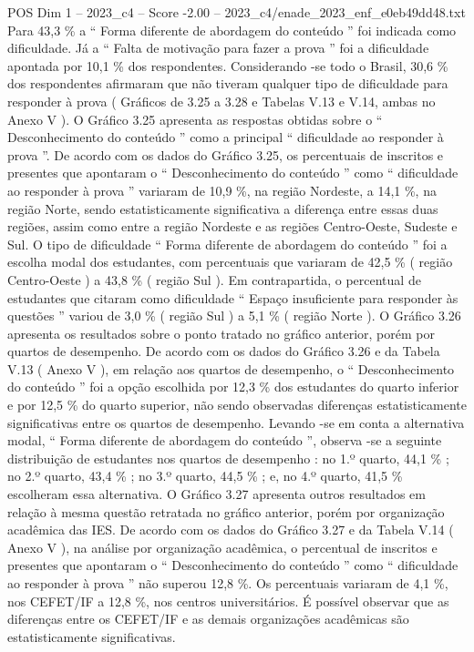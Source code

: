 \begin{textsample}{POS Dim 1 – 2023\_c4 – Score -2.00 – 2023\_c4/enade\_2023\_enf\_e0eb49dd48.txt}
Para 43,3 \% a “ Forma diferente de abordagem do conteúdo ” foi indicada como dificuldade.
Já a “ Falta de motivação para fazer a prova ” foi a dificuldade apontada por 10,1 \% dos respondentes.
Considerando -se todo o Brasil, 30,6 \% dos respondentes afirmaram que não tiveram qualquer tipo de dificuldade para responder à prova ( Gráficos de 3.25 a 3.28 e Tabelas V.13 e V.14, ambas no Anexo V ).
O Gráfico 3.25 apresenta as respostas obtidas sobre o “ Desconhecimento do conteúdo ” como a principal “ dificuldade ao responder à prova ”.
De acordo com os dados do Gráfico 3.25, os percentuais de inscritos e presentes que apontaram o “ Desconhecimento do conteúdo ” como “ dificuldade ao responder à prova ” variaram de 10,9 \%, na região Nordeste, a 14,1 \%, na região Norte, sendo estatisticamente significativa a diferença entre essas duas regiões, assim como entre a região Nordeste e as regiões Centro-Oeste, Sudeste e Sul.
O tipo de dificuldade “ Forma diferente de abordagem do conteúdo ” foi a escolha modal dos estudantes, com percentuais que variaram de 42,5 \% ( região Centro-Oeste ) a 43,8 \% ( região Sul ).
Em contrapartida, o percentual de estudantes que citaram como dificuldade “ Espaço insuficiente para responder às questões ” variou de 3,0 \% ( região Sul ) a 5,1 \% ( região Norte ).
O Gráfico 3.26 apresenta os resultados sobre o ponto tratado no gráfico anterior, porém por quartos de desempenho.
De acordo com os dados do Gráfico 3.26 e da Tabela V.13 ( Anexo V ), em relação aos quartos de desempenho, o “ Desconhecimento do conteúdo ” foi a opção escolhida por 12,3 \% dos estudantes do quarto inferior e por 12,5 \% do quarto superior, não sendo observadas diferenças estatisticamente significativas entre os quartos de desempenho.
Levando -se em conta a alternativa modal, “ Forma diferente de abordagem do conteúdo ”, observa -se a seguinte distribuição de estudantes nos quartos de desempenho : no 1.º quarto, 44,1 \% ; no 2.º quarto, 43,4 \% ; no 3.º quarto, 44,5 \% ; e, no 4.º quarto, 41,5 \% escolheram essa alternativa.
O Gráfico 3.27 apresenta outros resultados em relação à mesma questão retratada no gráfico anterior, porém por organização acadêmica das IES.
De acordo com os dados do Gráfico 3.27 e da Tabela V.14 ( Anexo V ), na análise por organização acadêmica, o percentual de inscritos e presentes que apontaram o “ Desconhecimento do conteúdo ” como “ dificuldade ao responder à prova ” não superou 12,8 \%.
Os percentuais variaram de 4,1 \%, nos CEFET/IF a 12,8 \%, nos centros universitários.
É possível observar que as diferenças entre os CEFET/IF e as demais organizações acadêmicas são estatisticamente significativas.

\end{textsample}
